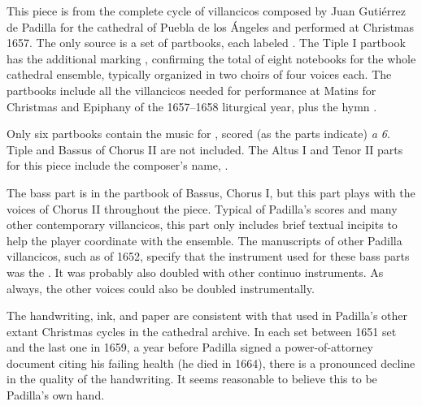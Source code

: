 
\begin{notesources}

\item
{}

\item
{}

\end{notesources}

This piece is from the complete cycle of villancicos composed by Juan Gutiérrez de Padilla for the cathedral of Puebla de los Ángeles and performed at Christmas 1657.
The only source is a set of partbooks, each labeled .
The Tiple I partbook has the additional marking , confirming the total of eight notebooks for the whole cathedral ensemble, typically organized in two choirs of four voices each.
The partbooks include all the villancicos needed for performance at Matins for Christmas and Epiphany of the 1657--1658 liturgical year, plus the hymn .

Only six partbooks contain the music for , scored (as the parts indicate) \emph{a 6}.
Tiple and Bassus of Chorus II are not included.
The Altus I and Tenor II parts for this piece include the composer's name, .

The bass part is in the partbook of Bassus, Chorus I, but this part plays with the voices of Chorus II throughout the piece.
Typical of Padilla's scores and many other contemporary villancicos, this part only includes brief textual incipits to help the player coordinate with the ensemble.
The manuscripts of other Padilla villancicos, such as  of 1652, specify that the instrument used for these bass parts was the .
It was probably also doubled with other continuo instruments.
As always, the other voices could also be doubled instrumentally.

The handwriting, ink, and paper are consistent with that used in Padilla's other extant Christmas cycles in the cathedral archive.
In each set between 1651 set and the last one in 1659, a year before Padilla signed a power-of-attorney document citing his failing health\autocite{Mauleon:PadillaCivil} (he died in 1664), there is a pronounced decline in the quality of the handwriting.
It seems reasonable to believe this to be Padilla's own hand.

